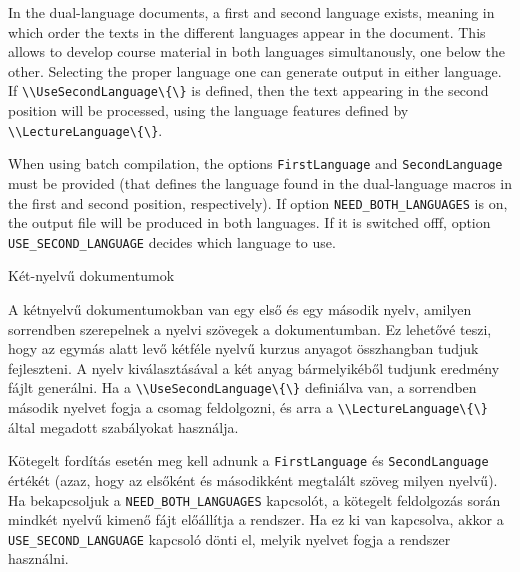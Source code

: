 {

In the dual-language documents, a first and second language exists,
meaning in which order the texts in the different languages appear in the document. This allows to develop course material in both languages simultanously, one below the other. Selecting the proper language
one can generate output in either language.
If \lstinline|\\UseSecondLanguage\{\}| is defined, then the text appearing in the second position will be processed, using the 
language features defined by \lstinline|\\LectureLanguage\{\}|.

When using batch compilation, the options  \lstinline|FirstLanguage| and
\lstinline|SecondLanguage| must be provided (that defines the language
 found in the dual-language macros in the first and second position, respectively). If option \lstinline|NEED_BOTH_LANGUAGES| is on,
 the output file will be produced in both languages.
 If it is switched offf, option \lstinline|USE_SECOND_LANGUAGE| decides
 which language to use.
}
{Két-nyelvű dokumentumok}
{
A kétnyelvű dokumentumokban van egy első és egy második nyelv,
amilyen sorrendben szerepelnek a nyelvi szövegek a dokumentumban.
Ez lehetővé teszi, hogy az egymás alatt levő kétféle nyelvű kurzus anyagot összhangban tudjuk fejleszteni. A nyelv kiválasztásával a két anyag bármelyikéből tudjunk eredmény fájlt generálni.
Ha a \lstinline|\\UseSecondLanguage\{\}| definiálva van, a sorrendben
második nyelvet fogja a csomag feldolgozni, és arra a \lstinline|\\LectureLanguage\{\}| által megadott szabályokat használja.

Kötegelt fordítás esetén meg kell adnunk a \lstinline|FirstLanguage| és
\lstinline|SecondLanguage| értékét (azaz, hogy az elsőként és másodikként megtalált szöveg milyen nyelvű).
Ha bekapcsoljuk a \lstinline|NEED_BOTH_LANGUAGES| kapcsolót,
a kötegelt feldolgozás során mindkét nyelvű kimenő fájt előállítja a rendszer. Ha ez ki van kapcsolva, akkor a \lstinline|USE_SECOND_LANGUAGE| kapcsoló dönti el, melyik nyelvet fogja a rendszer használni. 

}
%
%
%
%
%
